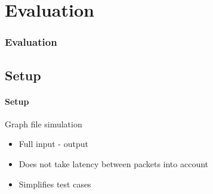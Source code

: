 \section{Evaluation}
\newcommand{\EvaluationTitle}{Evaluation}
\begin{frame}[fragile]
    \frametitle{\EvaluationTitle}
    \subsection{Setup}
    \framesubtitle{Setup}
    Graph file simulation\\
    \begin{itemize}%
        \item Full input - output
        \item Does not take latency between packets into account
        \item Simplifies test cases
    \end{itemize}
\end{frame}


